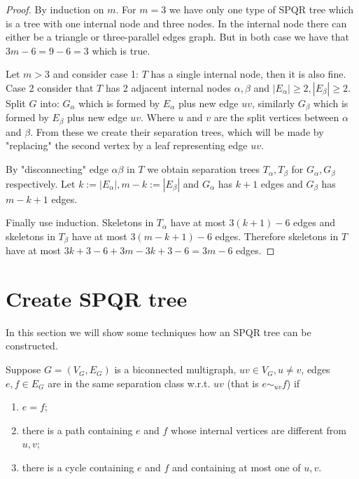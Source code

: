 \begin{proof}
	By induction on $m$. For $m = 3$ we have only one type of SPQR tree which is a tree with one internal node and three nodes. In the internal node there can either be a triangle or three-parallel edges graph. But in both case we have that $3m - 6 = 9 - 6 = 3$ which is true.
	
	Let $m > 3$ and consider case 1: $T$ has a single internal node, then it is also fine. Case 2 consider that $T$ has 2 adjacent internal nodes $\alpha, \beta$ and $|E_\alpha| \geq 2, |E_\beta| \geq 2$. Split $G$ into: $G_\alpha$ which is formed by $E_\alpha$ plus new edge $uv$, similarly $G_\beta$ which is formed by $E_\beta$ plus new edge $uv$. Where $u$ and $v$ are the split vertices between $\alpha$ and $\beta$. From these we create their separation trees, which will be made by "replacing" the second vertex by a leaf representing edge $uv$.
	
	By "disconnecting" edge $\alpha\beta$ in $T$ we obtain separation trees $T_\alpha, T_\beta$ for $G_\alpha, G_\beta$ respectively. Let $k := |E_\alpha|, m -k := |E_\beta|$ and $G_\alpha$ has $k+1$ edges and $G_\beta$ has $m-k+1$ edges.
	
	Finally use induction. Skeletons in $T_\alpha$ have at most $3(k+1)-6$ edges and skeletons in $T_\beta$ have at most $3(m-k+1)-6$ edges. Therefore skeletons in $T$ have at most $3k + 3 - 6 + 3m - 3k + 3 - 6 = 3m -6$ edges.
\end{proof}

\section{Create SPQR tree}

In this section we will show some techniques how an SPQR tree can be constructed.

\begin{defn}
	Suppose $G = (V_G, E_G)$ is a biconnected multigraph, $uv \in V_G, u \neq v$, edges $e,f \in E_G$ are in the same separation class w.r.t. $uv$ (that is $e \sim_{uv} f$) if
	
	\begin{enumerate}
		\item $e = f$;
		\item there is a path containing $e$ and $f$ whose internal vertices are different from $u,v$;
		\item there is a cycle containing $e$ and $f$ and containing at most one of $u,v$.
	\end{enumerate}
\end{defn}

